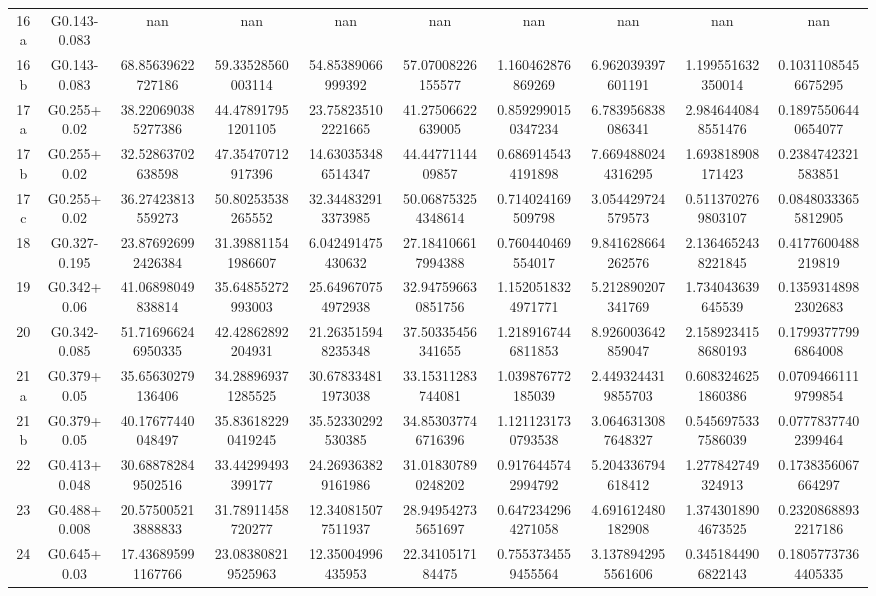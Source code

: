 \begin{table}
\begin{tabular}{cccccccccc}
16a & G0.143-0.083 & nan & nan & nan & nan & nan & nan & nan & nan \\
16b & G0.143-0.083 & 68.85639622727186 & 59.33528560003114 & 54.85389066999392 & 57.07008226155577 & 1.160462876869269 & 6.962039397601191 & 1.199551632350014 & 0.10311085456675295 \\
17a & G0.255+0.02 & 38.220690385277386 & 44.478917951201105 & 23.758235102221665 & 41.27506622639005 & 0.8592990150347234 & 6.783956838086341 & 2.9846440848551476 & 0.18975506440654077 \\
17b & G0.255+0.02 & 32.52863702638598 & 47.35470712917396 & 14.630353486514347 & 44.4477114409857 & 0.6869145434191898 & 7.6694880244316295 & 1.693818908171423 & 0.2384742321583851 \\
17c & G0.255+0.02 & 36.27423813559273 & 50.80253538265552 & 32.344832913373985 & 50.068753254348614 & 0.714024169509798 & 3.054429724579573 & 0.5113702769803107 & 0.08480333655812905 \\
18 & G0.327-0.195 & 23.876926992426384 & 31.398811541986607 & 6.042491475430632 & 27.184106617994388 & 0.760440469554017 & 9.841628664262576 & 2.1364652438221845 & 0.4177600488219819 \\
19 & G0.342+0.06 & 41.06898049838814 & 35.64855272993003 & 25.649670754972938 & 32.947596630851756 & 1.1520518324971771 & 5.212890207341769 & 1.734043639645539 & 0.13593148982302683 \\
20 & G0.342-0.085 & 51.716966246950335 & 42.42862892204931 & 21.263515948235348 & 37.50335456341655 & 1.2189167446811853 & 8.926003642859047 & 2.1589234158680193 & 0.17993777996864008 \\
21a & G0.379+0.05 & 35.65630279136406 & 34.288969371285525 & 30.678334811973038 & 33.15311283744081 & 1.039876772185039 & 2.4493244319855703 & 0.6083246251860386 & 0.07094661119799854 \\
21b & G0.379+0.05 & 40.17677440048497 & 35.836182290419245 & 35.52330292530385 & 34.853037746716396 & 1.1211231730793538 & 3.0646313087648327 & 0.5456975337586039 & 0.07778377402399464 \\
22 & G0.413+0.048 & 30.688782849502516 & 33.44299493399177 & 24.269363829161986 & 31.018307890248202 & 0.9176445742994792 & 5.204336794618412 & 1.277842749324913 & 0.1738356067664297 \\
23 & G0.488+0.008 & 20.575005213888833 & 31.78911458720277 & 12.340815077511937 & 28.949542735651697 & 0.6472342964271058 & 4.691612480182908 & 1.3743018904673525 & 0.23208688932217186 \\
24 & G0.645+0.03 & 17.436895991167766 & 23.083808219525963 & 12.35004996435953 & 22.3410517184475 & 0.7553734559455564 & 3.1378942955561606 & 0.3451844906822143 & 0.18057737364405335 \\

\end{tabular}
\end{table}
